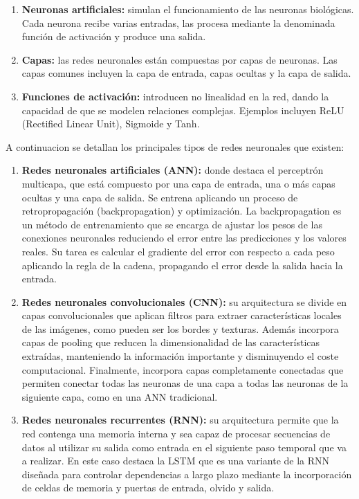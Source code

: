 \begin{enumerate}
    \item \textbf{Neuronas artificiales:} simulan el funcionamiento de las neuronas biológicas. Cada neurona recibe varias entradas, las procesa mediante la denominada función de activación y produce una salida.
    \item \textbf{Capas:} las redes neuronales están compuestas por capas de neuronas. Las capas comunes incluyen la capa de entrada, capas ocultas y la capa de salida.
    \item \textbf{Funciones de activación:} introducen no linealidad en la red, dando la capacidad de que se modelen relaciones complejas. Ejemplos incluyen ReLU (Rectified Linear Unit), Sigmoide y Tanh.
\end{enumerate}

A continuacion se detallan los principales tipos de redes neuronales que existen:
\begin{enumerate}
    \item \textbf{Redes neuronales artificiales (ANN):} donde destaca el perceptrón multicapa, que  está compuesto por una capa de entrada, una o más capas ocultas y una capa de salida. Se entrena aplicando un proceso de retropropagación (backpropagation) y optimización. La backpropagation es un método de entrenamiento que se encarga de ajustar los pesos de las conexiones neuronales reduciendo el error entre las predicciones y los valores reales. Su tarea es calcular el gradiente del error con respecto a cada peso aplicando la regla de la cadena, propagando el error desde la salida hacia la entrada.
    \item \textbf{Redes neuronales convolucionales (CNN):} su arquitectura se divide en capas convolucionales que aplican filtros para extraer características locales de las imágenes, como pueden ser los bordes y texturas. Además incorpora capas de pooling que reducen la dimensionalidad de las características extraídas, manteniendo la información importante y disminuyendo el coste computacional. Finalmente, incorpora capas completamente conectadas que permiten conectar todas las neuronas de una capa a todas las neuronas de la siguiente capa, como en una ANN tradicional.
    \item \textbf{Redes neuronales recurrentes (RNN):} su arquitectura permite que la red contenga una memoria interna y sea capaz de procesar secuencias de datos al utilizar su salida como entrada en el siguiente paso temporal que va a realizar. En este caso destaca la LSTM que es una variante de la RNN diseñada para controlar dependencias a largo plazo mediante la incorporación de celdas de memoria y puertas de entrada, olvido y salida.

\end{enumerate}




